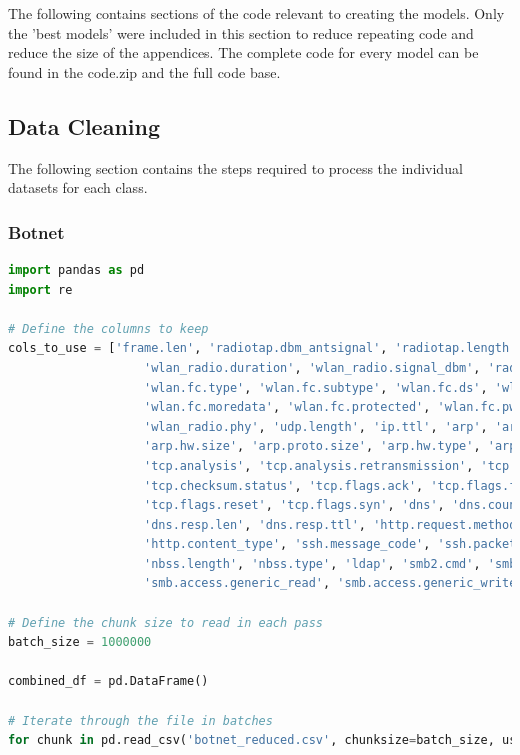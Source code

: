 \begin{appendices}
The following contains sections of the code relevant to creating the models. Only the 'best models' were included in this section to reduce repeating code and reduce the size of the appendices. The complete code for every model can be found in the code.zip and the full code base. 

\subsection{Data Cleaning}
\label{appx: Data Cleaning}
The following section contains the steps required to process the individual datasets for each class. 
\subsubsection*{Botnet}
\begin{lstlisting}[language=Python]
import pandas as pd
import re

# Define the columns to keep
cols_to_use = ['frame.len', 'radiotap.dbm_antsignal', 'radiotap.length', 'wlan.duration',
                   'wlan_radio.duration', 'wlan_radio.signal_dbm', 'radiotap.present.tsft',
                   'wlan.fc.type', 'wlan.fc.subtype', 'wlan.fc.ds', 'wlan.fc.frag',
                   'wlan.fc.moredata', 'wlan.fc.protected', 'wlan.fc.pwrmgt', 'wlan.fc.retry',
                   'wlan_radio.phy', 'udp.length', 'ip.ttl', 'arp', 'arp.proto.type',
                   'arp.hw.size', 'arp.proto.size', 'arp.hw.type', 'arp.opcode',
                   'tcp.analysis', 'tcp.analysis.retransmission', 'tcp.option_len',
                   'tcp.checksum.status', 'tcp.flags.ack', 'tcp.flags.fin', 'tcp.flags.push',
                   'tcp.flags.reset', 'tcp.flags.syn', 'dns', 'dns.count.queries', 'dns.count.answers',
                   'dns.resp.len', 'dns.resp.ttl', 'http.request.method', 'http.response.code',
                   'http.content_type', 'ssh.message_code', 'ssh.packet_length', 'nbns',
                   'nbss.length', 'nbss.type', 'ldap', 'smb2.cmd', 'smb.flags.response',
                   'smb.access.generic_read', 'smb.access.generic_write', 'smb.access.generic_execute','Label']

# Define the chunk size to read in each pass
batch_size = 1000000

combined_df = pd.DataFrame()

# Iterate through the file in batches
for chunk in pd.read_csv('botnet_reduced.csv', chunksize=batch_size, usecols=cols_to_use, low_memory=False):
    

\end{lstlisting}
\end{appendices}
